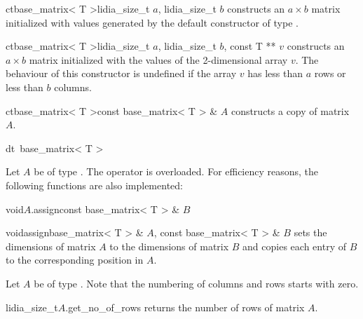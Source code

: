 \begin{fcode}{ct}{base_matrix< T >}{lidia_size_t $a$, lidia_size_t $b$}
  constructs an $a \times b$ matrix initialized with values generated by the default constructor
  of type .
\end{fcode}

\begin{fcode}{ct}{base_matrix< T >}{lidia_size_t $a$, lidia_size_t $b$, const T ** $v$}
  constructs an $a \times b$ matrix initialized with the values of the 2-dimensional array $v$.
  The behaviour of this constructor is undefined if the array $v$ has less than $a$ rows or less
  than $b$ columns.
\end{fcode}

\begin{fcode}{ct}{base_matrix< T >}{const base_matrix< T > & $A$}
  constructs a copy of matrix $A$.
\end{fcode}

\begin{fcode}{dt}{~base_matrix< T >}{}
\end{fcode}



\ASGN

Let $A$ be of type .  The operator \code{=} is overloaded.  For
efficiency reasons, the following functions are also implemented:

\begin{fcode}{void}{$A$.assign}{const base_matrix< T > & $B$}
\end{fcode}

\begin{fcode}{void}{assign}{base_matrix< T > & $A$, const base_matrix< T > & $B$}
  sets the dimensions of matrix $A$ to the dimensions of matrix $B$ and copies each entry of $B$
  to the corresponding position in $A$.
\end{fcode}



\ACCS

Let $A$ be of type .  Note that the numbering of columns and rows starts
with zero.




\begin{cfcode}{lidia_size_t}{$A$.get_no_of_rows}{}
  returns the number of rows of matrix $A$.
\end{cfcode}

